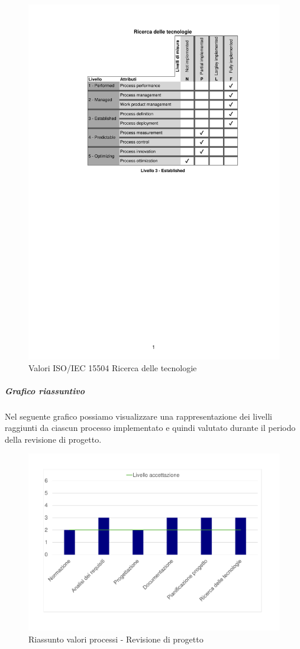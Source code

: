 \begin{figure}[H]
	\centering
	\includegraphics[scale=1]{images/resoconto/RP/ricercadelletecnologie-RP.pdf}
	\caption{Valori ISO/IEC 15504 Ricerca delle tecnologie}	
\end{figure}
\newpage

\subparagraph{Grafico riassuntivo}
Nel seguente grafico possiamo visualizzare una rappresentazione dei livelli raggiunti da ciascun processo implementato e quindi valutato durante il periodo della revisione di progetto. 

\begin{figure}[H]
	\centering
	\includegraphics[scale=0.5]{images/resoconto/RP/chart-RP.pdf}
	\caption{Riassunto valori processi - Revisione di progetto}	
\end{figure}
\newpage
